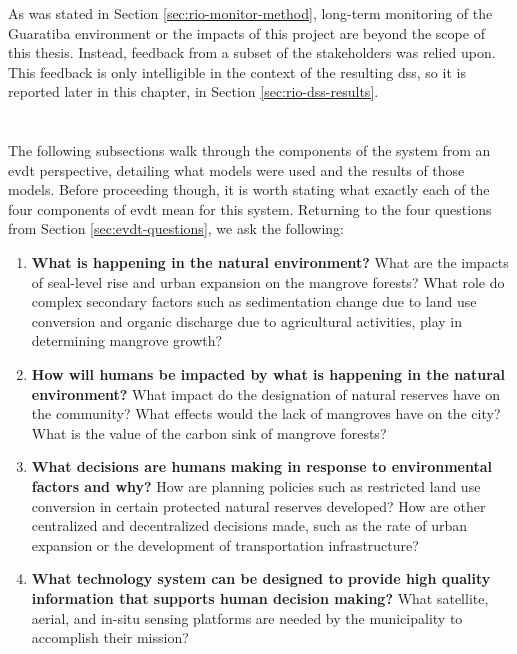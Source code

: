 \subsubsection{}

As was stated in Section \ref{sec:rio-monitor-method}, long-term monitoring of the Guaratiba environment or the impacts of this project are beyond the scope of this thesis. Instead, feedback from a subset of the stakeholders was relied upon. This feedback is only intelligible in the context of the resulting \ac{dss}, so it is reported later in this chapter, in Section \ref{sec:rio-dss-results}.

\section{} \label{sec:rio-evdt}

The following subsections walk through the components of the system from an \acf{evdt} perspective, detailing what models were used and the results of those models. Before proceeding though, it is worth stating what exactly each of the four components of \ac{evdt} mean for this system. Returning to the four questions from Section \ref{sec:evdt-questions}, we ask the following:

\begin{enumerate}[itemsep=0pt,parsep=0pt]
	\item \textbf{What is happening in the natural environment?} What are the impacts of seal-level rise and urban expansion on the mangrove forests? What role do complex secondary factors such as sedimentation change due to land use conversion and organic discharge due to agricultural activities, play in determining mangrove growth? 
	\item \textbf{How will humans be impacted by what is happening in the natural environment?} What impact do the designation of natural reserves have on the community? What effects would the lack of mangroves have on the city? What is the value of the carbon sink of mangrove forests?
	\item \textbf{What decisions are humans making in response to environmental factors and why?} How are planning policies such as restricted land use conversion in certain protected natural reserves developed? How are other centralized and decentralized decisions made, such as the rate of urban expansion or the development of transportation infrastructure? 
	\item \textbf{What technology system can be designed to provide high quality information that supports human decision making?} What satellite, aerial, and in-situ sensing platforms are needed by the municipality to accomplish their mission?
\end{enumerate}

